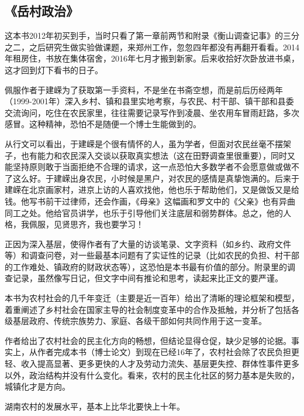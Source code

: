 \subsection{《岳村政治》}
这本书2012年初买到手，当时只看了第一章前两节和附录《衡山调查记事》的三分之二，之后研究生做实验做课题，来郑州工作，忽忽四年都没有再翻开看看。2014年租房住，书放在集体宿舍，2016年七月才搬到新家。后来收拾好次卧放进书桌，这才回到灯下看书的日子。

佩服作者于建嵘为了获取第一手资料，不是坐在书斋空想，而是前后历经两年（1999-2001年）深入乡村、镇和县里实地考察，与农民、村干部、镇干部和县委交流询问，吃住在农民家里，往往需要记录写作到凌晨、坐农用车冒雨赶路，多次感冒。这种精神，恐怕不是随便一个博士生能做到的。

从行文可以看出，于建嵘是个很有情怀的人，虽为学者，但面对农民丝毫不摆架子，也有能力和农民深入交谈以获取真实想法（这在田野调查里很重要），同时又能坚持原则敢于当面拒绝不合理的请求，这一点恐怕大多数学者不会愿意做或做不了这么好。于建嵘出身农民，小时候是黑户，对农民的感情是真挚饱满的。后来于建嵘在北京画家村，进京上访的人喜欢找他，他也乐于帮助他们，又是做饭又是给钱。他写书前干过律师，还会作画，《母亲》这幅画和罗文中的《父亲》也有异曲同工之处。他给官员讲学，也乐于引导他们关注底层和弱势群体。总之，他的人格，我佩服，见贤思齐，我也要学习！

正因为深入基层，使得作者有了大量的访谈笔录、文字资料（如乡约、政府文件等）和调查问卷，对一些最基本问题有了实证性的记录（比如农民的负担、村干部的工作难处、镇政府的财政状态等），这恐怕是本书最有价值的部分。附录里的调查记录，虽然像写日记，但文字中间有推论和思考，读起来比正文的要严谨。

本书为农村社会的几千年变迁（主要是近一百年）给出了清晰的理论框架和模型，着重阐述了乡村社会在国家主导的社会制度变革中的合作及抵触，并分析了包括各级基层政府、传统宗族势力、家庭、各级干部如何共同作用于这一变革。

作者给出了农村社会的民主化方向的畅想，但结论显得仓促，缺少足够的论据。事实上，从作者完成本书（博士论文）到现在已经16年了，农村社会除了农民负担更轻、收入提高显著、更多更快的人才及劳动力流失、基层更失控、群体性事件更多以外，政治结构并没有什么变化。看来，农村的民主化社区的努力基本是失败的，城镇化才是方向。

湖南农村的发展水平，基本上比华北要快上十年。